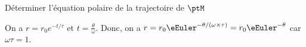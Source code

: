 


\hauteurLargeurCadreReponse		{8mm}{6cm}

\begin{enonce}
	Déterminer l'équation polaire de la trajectoire de $\ptM$
\end{enonce}


\begin{corrige}
	On a $r = r_0e^{-t/\tau}$ et $t=\frac{\theta}{\omega}$. Donc, on a 
	$r = r_0\eEuler^{-\theta/(\omega\times \tau)} = r_0\eEuler^{-\theta}$ car $\omega \tau = 1$.
\end{corrige}



\finEntrainement



\newpage








\hauteurLargeurCadreReponse		{8mm}{4cm}
\initialisationEntrainement



